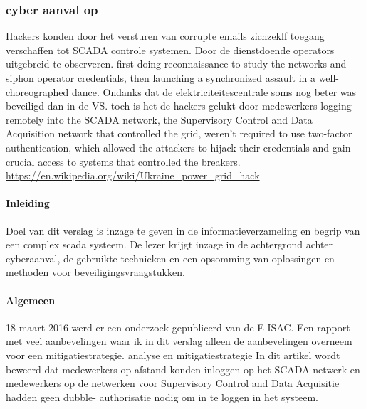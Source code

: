 
\subsubsection{ cyber aanval op  }


Hackers konden door het versturen van corrupte emails zichzeklf toegang verschaffen tot  SCADA controle systemen. Door de dienstdoende operators uitgebreid te observeren.
first doing reconnaissance to study the networks and siphon operator credentials, then launching a synchronized assault in a well-choreographed dance.
Ondanks dat de elektriciteitescentrale soms nog beter was beveiligd dan in de VS. toch is het de hackers gelukt door medewerkers logging remotely into the SCADA network, the Supervisory Control and Data Acquisition network that controlled the grid, weren't required to use two-factor authentication, which allowed the attackers to hijack their credentials and gain crucial access to systems that controlled the breakers.
\url{https://en.wikipedia.org/wiki/Ukraine_power_grid_hack }



\paragraph{Inleiding}



Doel van dit verslag is inzage te geven in de informatieverzameling en begrip van een complex scada
systeem. De lezer krijgt inzage in de achtergrond achter cyberaanval, de gebruikte technieken en
een opsomming van oplossingen en methoden voor beveiligingsvraagstukken.

\paragraph{Algemeen}


18 maart 2016 werd er een onderzoek gepublicerd van de E-ISAC. Een rapport met veel
aanbevelingen waar ik in dit verslag alleen de aanbevelingen overneem voor een mitigatiestrategie.
analyse en mitigatiestrategie
In dit artikel wordt beweerd dat medewerkers op afstand konden inloggen op het SCADA netwerk en
medewerkers op de netwerken voor Supervisory Control and Data Acquisitie hadden geen dubble-
authorisatie nodig om in te loggen in het systeem.


